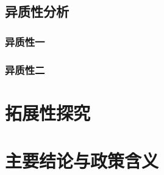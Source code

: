 \documentclass[a4paper, 12pt, oneside]{article} %
\begin{document}
	\subsection{异质性分析}
	
	\subsubsection{异质性一}
	
	\subsubsection{异质性二}
	
	\section{拓展性探究}
	
	\section{主要结论与政策含义}
	
	\newpage
\end{document}
